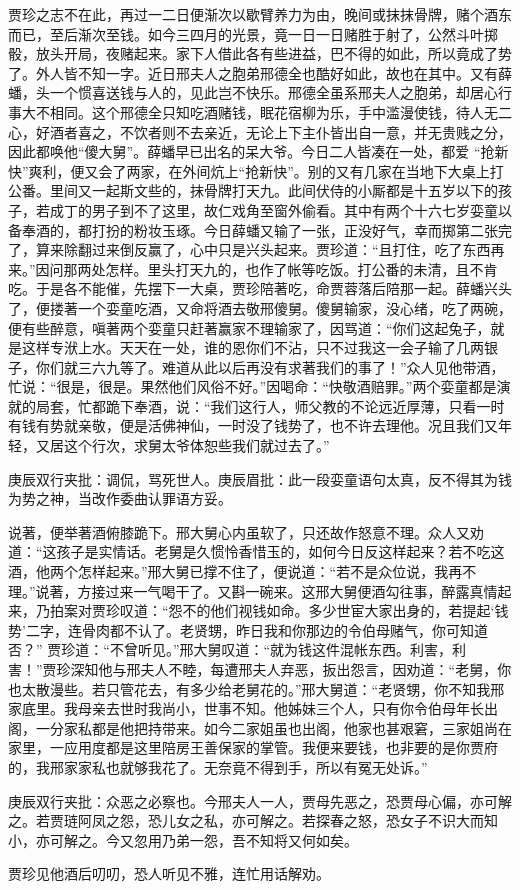 \begin{parag}
    贾珍之志不在此，再过一二日便渐次以歇臂养力为由，晚间或抹抹骨牌，赌个酒东而已，至后渐次至钱。如今三四月的光景，竟一日一日赌胜于射了，公然斗叶掷骰，放头开局，夜赌起来。家下人借此各有些进益，巴不得的如此，所以竟成了势了。外人皆不知一字。近日邢夫人之胞弟邢德全也酷好如此，故也在其中。又有薛蟠，头一个惯喜送钱与人的，见此岂不快乐。邢德全虽系邢夫人之胞弟，却居心行事大不相同。这个邢德全只知吃酒赌钱，眠花宿柳为乐，手中滥漫使钱，待人无二心，好酒者喜之，不饮者则不去亲近，无论上下主仆皆出自一意，并无贵贱之分，因此都唤他“傻大舅”。薛蟠早已出名的呆大爷。今日二人皆凑在一处，都爱 “抢新快”爽利，便又会了两家，在外间炕上“抢新快”。别的又有几家在当地下大桌上打公番。里间又一起斯文些的，抹骨牌打天九。此间伏侍的小厮都是十五岁以下的孩子，若成丁的男子到不了这里，故仁戏角至窗外偷看。其中有两个十六七岁娈童以备奉酒的，都打扮的粉妆玉琢。今日薛蟠又输了一张，正没好气，幸而掷第二张完了，算来除翻过来倒反赢了，心中只是兴头起来。贾珍道：“且打住，吃了东西再来。”因问那两处怎样。里头打天九的，也作了帐等吃饭。打公番的未清，且不肯吃。于是各不能催，先摆下一大桌，贾珍陪著吃，命贾蓉落后陪那一起。薛蟠兴头了，便搂著一个娈童吃酒，又命将酒去敬邢傻舅。傻舅输家，没心绪，吃了两碗，便有些醉意，嗔著两个娈童只赶著赢家不理输家了，因骂道：“你们这起兔子，就是这样专洑上水。天天在一处，谁的恩你们不沾，只不过我这一会子输了几两银子，你们就三六九等了。难道从此以后再没有求著我们的事了！”众人见他带酒，忙说：“很是，很是。果然他们风俗不好。”因喝命：“快敬酒赔罪。”两个娈童都是演就的局套，忙都跪下奉酒，说：“我们这行人，师父教的不论远近厚薄，只看一时有钱有势就亲敬，便是活佛神仙，一时没了钱势了，也不许去理他。况且我们又年轻，又居这个行次，求舅太爷体恕些我们就过去了。”\begin{note}庚辰双行夹批：调侃，骂死世人。庚辰眉批：此一段娈童语句太真，反不得其为钱为势之神，当改作委曲认罪语方妥。\end{note}说著，便举著酒俯膝跪下。邢大舅心内虽软了，只还故作怒意不理。众人又劝道：“这孩子是实情话。老舅是久惯怜香惜玉的，如何今日反这样起来？若不吃这酒，他两个怎样起来。”邢大舅已撑不住了，便说道：“若不是众位说，我再不理。”说著，方接过来一气喝干了。又斟一碗来。这邢大舅便酒勾往事，醉露真情起来，乃拍案对贾珍叹道：“怨不的他们视钱如命。多少世宦大家出身的，若提起‘钱势’二字，连骨肉都不认了。老贤甥，昨日我和你那边的令伯母赌气，你可知道否？” 贾珍道：“不曾听见。”邢大舅叹道：“就为钱这件混帐东西。利害，利害！”贾珍深知他与邢夫人不睦，每遭邢夫人弃恶，扳出怨言，因劝道：“老舅，你也太散漫些。若只管花去，有多少给老舅花的。”邢大舅道：“老贤甥，你不知我邢家底里。我母亲去世时我尚小，世事不知。他姊妹三个人，只有你令伯母年长出阁，一分家私都是他把持带来。如今二家姐虽也出阁，他家也甚艰窘，三家姐尚在家里，一应用度都是这里陪房王善保家的掌管。我便来要钱，也非要的是你贾府的，我邢家家私也就够我花了。无奈竟不得到手，所以有冤无处诉。”\begin{note}庚辰双行夹批：众恶之必察也。今邢夫人一人，贾母先恶之，恐贾母心偏，亦可解之。若贾琏阿凤之怨，恐儿女之私，亦可解之。若探春之怒，恐女子不识大而知小，亦可解之。今又忽用乃弟一怨，吾不知将又何如矣。\end{note}贾珍见他酒后叨叨，恐人听见不雅，连忙用话解劝。
\end{parag}


